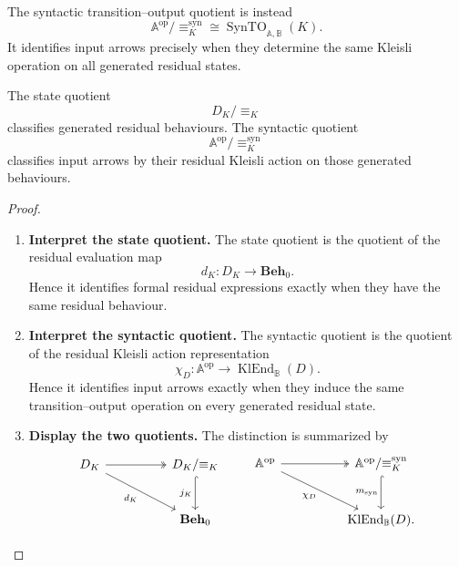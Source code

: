 The syntactic transition--output quotient is instead
\[
    \mathbb A^{\mathrm{op}}/{\equiv_K^{\mathrm{syn}}}
    \cong
    \operatorname{SynTO}_{\mathbb A,\mathbb B}(K).
\]
It identifies input arrows precisely when they determine the same Kleisli
operation on all generated residual states.

\begin{proposition}
\label{prop:syn-to-state-vs-syntactic}
    The state quotient
    \[
        D_K/{\equiv_K}
    \]
    classifies generated residual behaviours. The syntactic quotient
    \[
        \mathbb A^{\mathrm{op}}/{\equiv_K^{\mathrm{syn}}}
    \]
    classifies input arrows by their residual Kleisli action on those generated
    behaviours.
\end{proposition}

\begin{proof}
    \leavevmode
    \begin{enumerate}
        \item \textbf{Interpret the state quotient.}
        The state quotient is the quotient of the residual evaluation map
        \[
            d_K:D_K\to\mathbf{Beh}_0.
        \]
        Hence it identifies formal residual expressions exactly when they have
        the same residual behaviour.

        \item \textbf{Interpret the syntactic quotient.}
        The syntactic quotient is the quotient of the residual Kleisli action
        representation
        \[
            \chi_D:
            \mathbb A^{\mathrm{op}}
            \to
            \operatorname{KlEnd}_{\mathbb B}(D).
        \]
        Hence it identifies input arrows exactly when they induce the same
        transition--output operation on every generated residual state.

        \item \textbf{Display the two quotients.}
        The distinction is summarized by
        \[
        \begin{tikzcd}[column sep=huge, row sep=large]
            D_K
                \arrow[r, two heads]
                \arrow[dr, "d_K"']
            &
            D_K/{\equiv_K}
                \arrow[d, hook, "j_K"']
            \\
            &
            \mathbf{Beh}_0
        \end{tikzcd}
        \qquad
        \begin{tikzcd}[column sep=huge, row sep=large]
            \mathbb A^{\mathrm{op}}
                \arrow[r, two heads]
                \arrow[dr, "\chi_D"']
            &
            \mathbb A^{\mathrm{op}}/{\equiv_K^{\mathrm{syn}}}
                \arrow[d, hook, "m_{\mathrm{syn}}"']
            \\
            &
            \operatorname{KlEnd}_{\mathbb B}(D).
        \end{tikzcd}
        \]
    \end{enumerate}
\end{proof}

